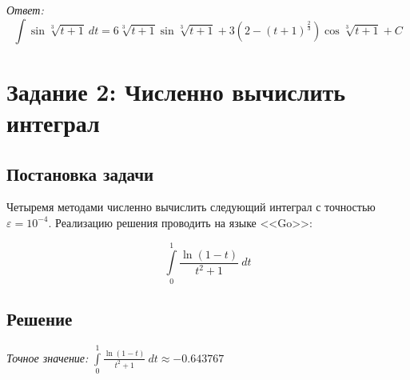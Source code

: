 \documentclass[14pt, a4paper, titlepage, fleqn]{extarticle}
\begin{document}
        \textit{Ответ:} 
        \[
            \displaystyle
            \int \sin{ \sqrt[3]{t+1} } ~ dt
            = 6 \sqrt[3]{t+1} \sin{\sqrt[3]{t+1}}
            + 3\left( 2 - (t+1)^{\frac{2}{3}} \right) \cos{\sqrt[3]{t+1}} + C 
        \]

    \pagebreak

    \section{Задание 2: Численно вычислить интеграл}
        \subsection{Постановка задачи}
            Четыремя методами численно вычислить следующий интеграл
            с точностью \( \varepsilon = 10^{-4} \).
            Реализацию решения проводить на языке <<Go>>:
            
            \[ \int\limits_0^1 \frac{\ln(1-t)}{t^2+1} ~ dt \]

        \subsection{Решение}
            \textit{Точное значение:}
            \( 
                \displaystyle
                \int\limits_0^1 \frac{\ln(1-t)}{t^2+1} ~ dt \approx -0.643767
            \)
\end{document}
